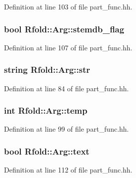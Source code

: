 Definition at line 103 of file part\+\_\+func.\+hh.

\hypertarget{class_rfold_1_1_arg_ad5d34ff788f8795f1e75f313dd67c79e}{
\subsubsection[{stemdb\+\_\+flag}]{\setlength{\rightskip}{0pt plus 5cm}bool Rfold\+::\+Arg\+::stemdb\+\_\+flag}}\label{class_rfold_1_1_arg_ad5d34ff788f8795f1e75f313dd67c79e}


Definition at line 107 of file part\+\_\+func.\+hh.

\hypertarget{class_rfold_1_1_arg_a10258eb45eb764844e49e5587e187af7}{
\subsubsection[{str}]{\setlength{\rightskip}{0pt plus 5cm}string Rfold\+::\+Arg\+::str}}\label{class_rfold_1_1_arg_a10258eb45eb764844e49e5587e187af7}


Definition at line 84 of file part\+\_\+func.\+hh.

\hypertarget{class_rfold_1_1_arg_a25e15defa3a3a80e6a0593989ea9e44a}{
\subsubsection[{temp}]{\setlength{\rightskip}{0pt plus 5cm}int Rfold\+::\+Arg\+::temp}}\label{class_rfold_1_1_arg_a25e15defa3a3a80e6a0593989ea9e44a}


Definition at line 99 of file part\+\_\+func.\+hh.

\hypertarget{class_rfold_1_1_arg_ad174f7be713784b338a8e3423c950dac}{
\subsubsection[{text}]{\setlength{\rightskip}{0pt plus 5cm}bool Rfold\+::\+Arg\+::text}}\label{class_rfold_1_1_arg_ad174f7be713784b338a8e3423c950dac}


Definition at line 112 of file part\+\_\+func.\+hh.

